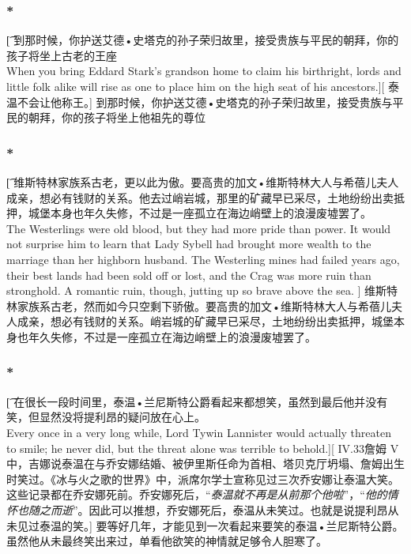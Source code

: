 \documentclass[12pt,a4paper]{article}
\begin{document}
\subsubsection{\color{red}*}\t[
	到那时候，你护送艾德•史塔克的孙子荣归故里，接受贵族与平民的朝拜，你的孩子将坐上古老的王座\\
	When you bring Eddard Stark's grandson home to claim his birthright, lords and little folk alike will rise as one to place him on the high seat of his ancestors.][
	泰温不会让他称王。]
	到那时候，你护送艾德•史塔克的孙子荣归故里，接受贵族与平民的朝拜，你的孩子将坐上他祖先的尊位
	
\subsubsection{\color{red}*}\t[
	维斯特林家族系古老，更以此为傲。要高贵的加文•维斯特林大人与希蓓儿夫人成亲，想必有钱财的关系。他去过峭岩城，那里的矿藏早已采尽，土地纷纷出卖抵押，城堡本身也年久失修，不过是一座孤立在海边峭壁上的浪漫废墟罢了。\\
	The Westerlings were old blood, but they had more pride than power. It would not surprise him to learn that Lady Sybell had brought more wealth to the marriage than her highborn husband. The Westerling mines had failed years ago, their best lands had been sold off or lost, and the Crag was more ruin than stronghold. A romantic ruin, though, jutting up so brave above the sea. ]
	维斯特林家族系古老，然而如今只空剩下骄傲。要高贵的加文•维斯特林大人与希蓓儿夫人成亲，想必有钱财的关系。峭岩城的矿藏早已采尽，土地纷纷出卖抵押，城堡本身也年久失修，不过是一座孤立在海边峭壁上的浪漫废墟罢了。
	
\subsubsection{\color{red}*}\t[
	在很长一段时间里，泰温•兰尼斯特公爵看起来都想笑，虽然到最后他并没有笑，但显然没将提利昂的疑问放在心上。\\
	Every once in a very long while, Lord Tywin Lannister would actually threaten to smile; he never did, but the threat alone was terrible to behold.][
	IV.33詹姆 V中，吉娜说泰温在与乔安娜结婚、被伊里斯任命为首相、塔贝克厅坍塌、詹姆出生时笑过。《冰与火之歌的世界》中，派席尔学士宣称见过三次乔安娜让泰温大笑。这些记录都在乔安娜死前。乔安娜死后，“\emph{泰温就不再是从前那个他啦}”，“\emph{他的情怀也随之而逝}”。因此可以推想，乔安娜死后，泰温从未笑过。也就是说提利昂从未见过泰温的笑。]
	要等好几年，才能见到一次看起来要笑的泰温•兰尼斯特公爵。虽然他从未最终笑出来过，单看他欲笑的神情就足够令人胆寒了。
	
\end{document}
